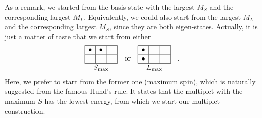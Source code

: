 As a remark, we started from the basis state with the largest $M_S$ and the corresponding largest
$M_L$. Equivalently, we could also start from the largest $M_L$ and the corresponding largest
$M_S$, since they are both eigen-states. Actually, it is just a matter of taste that
we start from either
\begin{equation*}
\begin{array}{|c|c|c|}
\hline
\bullet & \bullet & \phantom{\bullet} \\ \hline
\phantom{\bullet} & \phantom{\bullet} & \phantom{\bullet} \\
\hline
\multicolumn{3}{c}{S_\text{max}}
\end{array}
\quad \text{or} \quad
\begin{array}{|c|c|c|}
\hline
\bullet & \phantom{\bullet} & \phantom{\bullet} \\ \hline
\bullet & \phantom{\bullet} & \phantom{\bullet} \\
\hline
\multicolumn{3}{c}{L_\text{max}}
\end{array} \quad .
\end{equation*}
Here, we prefer to start from the former one (maximum spin), which is naturally
suggested from the famous Hund's rule. It states that the multiplet
with the maximum $S$ has the lowest energy, from which we start our multiplet construction.

